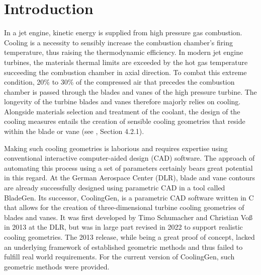 \documentclass[a4paper, 11pt]{report}
\theoremstyle{definition}
\begin{document}
\restoregeometry
\begin{abstract}
	\thispagestyle{plain}
	\setcounter{page}{3}
	\lipsum[1-3]
\end{abstract}
\renewcommand{\abstractname}{Zusammenfassung}
\begin{abstract}
	\thispagestyle{plain}
	\setcounter{page}{4}
	\lipsum[4-6]
\end{abstract}
\pagebreak

\setcounter{page}{5}
\restoregeometry
\tableofcontents
\pagebreak

\restoregeometry
{}
\setcounter{page}{1}
\pagestyle{plain}

\chapter{Introduction}
	In a jet engine, kinetic energy is supplied from high pressure gas combustion. Cooling is a necessity to sensibly increase the combustion chamber's firing temperature, thus raising the thermodynamic efficiency. In modern jet engine turbines, the materials thermal limits are exceeded by the hot gas temperature succeeding the combustion chamber in axial direction. To combat this extreme condition, 20\% to 30\% of the compressed air that precedes the combustion chamber is passed through the blades and vanes of the high pressure turbine. The longevity of the turbine blades and vanes therefore majorly relies on cooling. Alongside materials selection and treatment of the coolant, the design of the cooling measures entails the creation of sensible cooling geometries that reside within the blade or vane (see \cite{Giampaolo2020}, Section 4.2.1).

	Making such cooling geometries is laborious and requires expertise using conventional interactive computer-aided design (CAD) software. The approach of automating this process using a set of parameters certainly bears great potential in this regard. At the German Aerospace Center (DLR), blade and vane contours are already successfully designed using parametric CAD in a tool called BladeGen. Its successor, CoolingGen, is a parametric CAD software written in C that allows for the creation of three-dimensional turbine cooling geometries of blades and vanes. It was first developed by Timo Schumacher and Christian Voß in 2013 at the DLR, but was in large part revised in 2022 to support realistic cooling geometries. The 2013 release, while being a great proof of concept, lacked an underlying framework of established geometric methods and thus failed to fulfill real world requirements. For the current version of CoolingGen, such geometric methods were provided.
\end{document}
